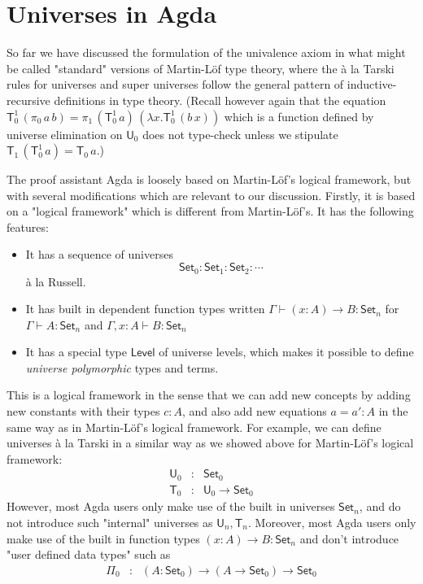 \documentclass[11pt,a4paper]{article}
\def\UU{\mathsf{U}}
\def\Level{\mathsf{Level}}
\newcommand{\Set}{\mathsf{Set}}
\newcommand{\T}{\mathsf{T}}
\begin{document}
\section{Universes in Agda}

So far we have discussed the formulation of the univalence axiom in what might be called "standard" versions of Martin-Löf type theory, where the \`a la Tarski rules for universes and super universes follow the general pattern of inductive-recursive definitions in type theory. (Recall however again that the equation
$
\T_0^1\, (\pi_0\,a\, b) = \pi_1\,(\T_0^1\,a)\,(\lambda x.\T_0^1\,(b\,x))
$
which is a function defined by universe elimination on $\UU_0$ does not type-check unless we stipulate $\T_1\, (\T_0^1\, a) = \T_0\, a$.)


The proof assistant Agda is loosely based on Martin-Löf's logical framework, but with several modifications which are relevant to our discussion. Firstly, it is based on a "logical framework" which is different from Martin-Löf's. It has the following features:
\begin{itemize}
\item It has a sequence of universes  $$\Set_0 : \Set_1 : \Set_2 : \cdots$$  \`a la Russell.
\item It has built in dependent function types written $\Gamma \vdash (x : A)\to B : \Set_n$ for $\Gamma \vdash A : \Set_n$ and $\Gamma , x : A \vdash B : \Set_n$
\item It has a special type $\Level$ of universe levels, which makes it possible to define {\em universe polymorphic} types and terms.
\end{itemize}
This is a logical framework in the sense that we can add new concepts by adding new constants with their types $c : A$, and also add new equations $a = a' : A$ in the same way as in Martin-Löf's logical framework. For example, we can define universes \`a la Tarski in a similar way as we showed above for Martin-Löf's logical framework:
\begin{eqnarray*}
\UU_0 &: &\Set_0\\
\T_0 &:& \UU_0 \to \Set_0
\end{eqnarray*}
However, most Agda users only make use of the built in universes $\Set_n$, and do not introduce such "internal" universes as $\UU_n, \T_n$. Moreover, most Agda users only make use of the built in function types $(x : A)\to B : \Set_n$ and don't introduce "user defined data types" such as
\begin{eqnarray*}
\Pi_0 &:& (A:\Set_0) \to (A \to \Set_0) \to \Set_0
\end{eqnarray*}
\end{document}
